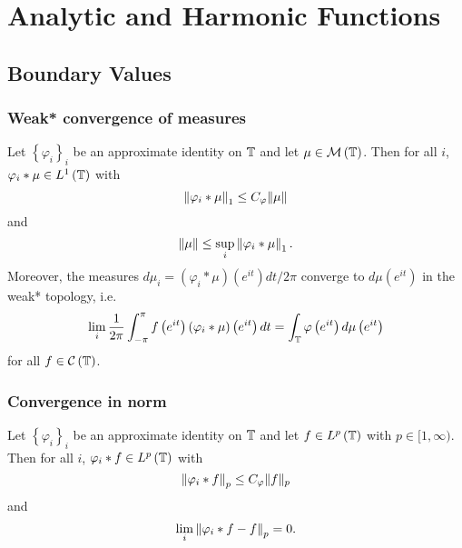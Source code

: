\section{Analytic and Harmonic Functions}
\subsection{Boundary Values}
\subsubsection{Weak* convergence of measures}
\begin{theorem}
    Let $\left\{ \varphi _{i} \right\}_{i}$ be an approximate identity on $\mathbb T$ and let $\mu \in {\cal M} \left( \mathbb T \right)$. Then for all $i$, $\varphi_{i} * \mu  \in L^{1} \left( \mathbb T \right)$ with
    \begin{equation*}
	\left\lVert \varphi _{i} * \mu \right\rVert_{1} \le C_{\varphi} \lVert \mu \rVert
    \end{equation*}
    and
    \begin{equation*}
	\left\lVert \mu \right\rVert \le \sup_{i} \left\lVert \varphi_{i} * \mu \right\rVert_{1}\text{.}
    \end{equation*}
    Moreover, the measures $d\mu_{i} = \left( \varphi_{i} * \mu \right) \left( e^{it} \right) dt/2\pi$ converge to $d\mu \left( e^{it} \right)$ in the weak* topology, i.e.
    \begin{equation*}
	\lim_{i} \frac{1}{2\pi} \int_{-\pi}^{\pi} f\left( e^{it} \right) \left( \varphi_{i} * \mu \right) \left( e^{it} \right) dt = \int_{\mathbb T} \varphi\left( e^{it} \right) d\mu \left( e^{it} \right)
    \end{equation*}
    for all $f \in {\cal C} \left( \mathbb T \right)$.
    \label{thm:weak-star-measures}
\end{theorem}

\subsubsection{Convergence in norm}
\begin{theorem}
    Let $\left\{ \varphi _{i} \right\}_{i}$ be an approximate identity on $\mathbb T$ and let $f \in L^{p} \left( \mathbb T \right)$ with $p \in [1, \infty)$. Then for all $i$, $\varphi_{i} * f  \in L^{p} \left( \mathbb T \right)$ with
    \begin{equation*}
	\left\lVert \varphi _{i} * f \right\rVert_{p} \le C_{\varphi} \lVert f \rVert _{p}
    \end{equation*}
    and
    \begin{equation*}
	\lim_{i} \left\lVert \varphi_{i} * f -f \right\rVert_{p} = 0 \text{.}
	    \end{equation*} 
    \label{thm:convergence-in-Lp}
\end{theorem}


